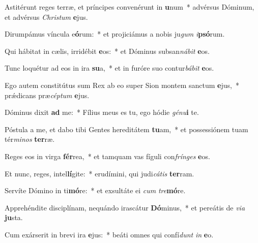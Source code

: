 \item Astitérunt reges terræ, et príncipes convenérunt in \textbf{u}num~* advérsus Dóminum, et advérsus \textit{Christum} \textbf{e}jus.
\item Dirumpámus víncula e\textbf{ó}rum:~* et projiciámus a nobis ju\textit{gum} \textit{i}\textbf{psó}rum. %
\item Qui hábitat in cælis, irridébit \textbf{e}os:~* et Dóminus subsan\textit{nábit} \textbf{e}os.
\item Tunc loquétur ad eos in ira \textbf{su}a,~* et in furóre suo contur\textit{bábit} \textbf{e}os.
\item Ego autem constitútus sum Rex ab eo super Sion montem sanctum \textbf{e}jus,~* prǽdicans præ\textit{céptum} \textbf{e}jus.
\item Dóminus dixit \textbf{ad} me:~* Fílius meus es tu, ego hódie \textit{génu}\textbf{i} te.
\item Póstula a me, et dabo tibi Gentes hereditátem \textbf{tu}am,~* et possessiónem tuam tér\textit{minos} \textbf{ter}ræ.
\item Reges eos in virga \textbf{fér}rea,~* et tamquam vas fíguli con\textit{frínges} \textbf{e}os.
\item Et nunc, reges, intel\textbf{lí}gite:~* erudímini, qui judi\textit{cátis} \textbf{ter}ram.
\item Servíte Dómino in ti\textbf{mó}re:~* et exsultáte ei \textit{cum} \textit{tre}\textbf{mó}re.
\item Apprehéndite disciplínam, nequándo irascátur \textbf{Dó}minus,~* et pereátis de \textit{via} \textbf{ju}sta.
\item Cum exárserit in brevi ira \textbf{e}jus:~* beáti omnes qui confí\textit{dunt} \textit{in} \textbf{e}o.
